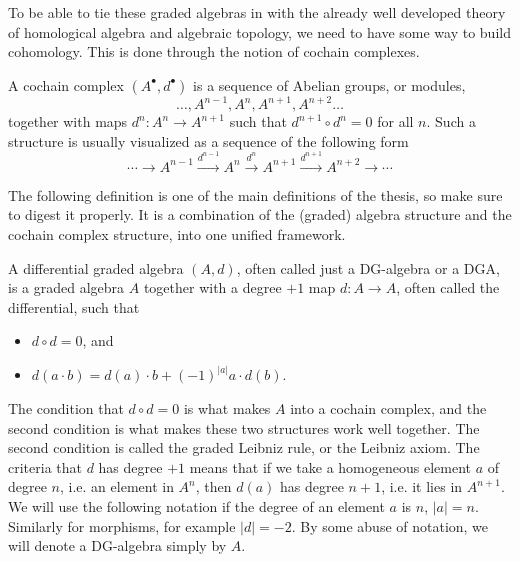 To be able to tie these graded algebras in with the already well developed theory of homological algebra and algebraic topology, we need to have some way to build cohomology. This is done through the notion of cochain complexes. 

\begin{definition}
\label{def:cochain_complex}
A cochain complex $(A^{\bullet}, d^{\bullet})$ is a sequence of Abelian groups, or modules,
\begin{equation*}
    \ldots, A^{n-1}, A^n, A^{n+1}, A^{n+2}\ldots
\end{equation*}
together with maps $d^n:A^n\rightarrow A^{n+1}$ such that $d^{n+1}\circ d^n = 0$ for all $n$. Such a structure is usually visualized as a sequence of the following form
\begin{equation*}
    \cdots\longrightarrow A^{n-1} \overset{d^{n-1}}\longrightarrow A^n \overset{d^n}\longrightarrow A^{n+1} \overset{d^{n+1}}\longrightarrow A^{n+2}\longrightarrow\cdots
\end{equation*}
\end{definition}

The following definition is one of the main definitions of the thesis, so make sure to digest it properly. It is a combination of the (graded) algebra structure and the cochain complex structure, into one unified framework. 

\begin{definition}[DG-algebra]
\label{def:dga}
A differential graded algebra $(A, d)$, often called just a DG-algebra or a DGA, is a graded algebra $A$ together with a degree $+1$ map $d: A\longrightarrow A$, often called the differential, such that 
\begin{itemize}
    \item $d\circ d = 0$, and
    \item $d(a\cdot b) = d(a)\cdot b + (-1)^{|a|}a\cdot d(b)$. 
\end{itemize}
\end{definition}

The condition that $d\circ d = 0$ is what makes $A$ into a cochain complex, and the second condition is what makes these two structures work well together. The second condition is called the graded Leibniz rule, or the Leibniz axiom. The criteria that $d$ has degree $+1$ means that if we take a homogeneous element $a$ of degree $n$, i.e. an element in $A^n$, then $d(a)$ has degree $n+1$, i.e. it lies in $A^{n+1}$. We will use the following notation if the degree of an element $a$ is $n$, $|a|=n$. Similarly for morphisms, for example $|d|=-2$. By some abuse of notation, we will denote a DG-algebra simply by $A$.

